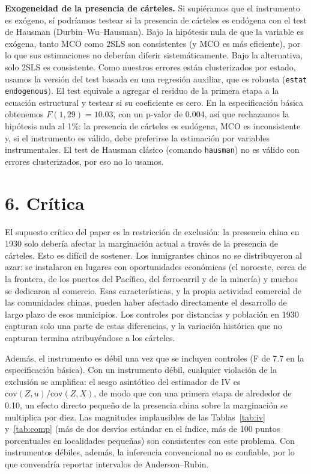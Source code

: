 \documentclass[11pt,a4paper]{article}
\begin{document}
\textbf{Exogeneidad de la presencia de cárteles.} Si supiéramos que el instrumento es exógeno, sí podríamos testear si la presencia de cárteles es endógena con el test de Hausman (Durbin--Wu--Hausman). Bajo la hipótesis nula de que la variable es exógena, tanto MCO como 2SLS son consistentes (y MCO es más eficiente), por lo que sus estimaciones no deberían diferir sistemáticamente. Bajo la alternativa, solo 2SLS es consistente. Como nuestros errores están clusterizados por estado, usamos la versión del test basada en una regresión auxiliar, que es robusta (\texttt{estat endogenous}). El test equivale a agregar el residuo de la primera etapa a la ecuación estructural y testear si su coeficiente es cero. En la especificación básica obtenemos $F(1,29)=10.03$, con un p-valor de 0.004, así que rechazamos la hipótesis nula al 1\%: la presencia de cárteles es endógena, MCO es inconsistente y, si el instrumento es válido, debe preferirse la estimación por variables instrumentales. El test de Hausman clásico (comando \texttt{hausman}) no es válido con errores clusterizados, por eso no lo usamos.

\section*{6. Crítica}

El supuesto crítico del paper es la restricción de exclusión: la presencia china en 1930 solo debería afectar la marginación actual a través de la presencia de cárteles. Esto es difícil de sostener. Los inmigrantes chinos no se distribuyeron al azar: se instalaron en lugares con oportunidades económicas (el noroeste, cerca de la frontera, de los puertos del Pacífico, del ferrocarril y de la minería) y muchos se dedicaron al comercio. Esas características, y la propia actividad comercial de las comunidades chinas, pueden haber afectado directamente el desarrollo de largo plazo de esos municipios. Los controles por distancias y población en 1930 capturan solo una parte de estas diferencias, y la variación histórica que no capturan termina atribuyéndose a los cárteles.

Además, el instrumento es débil una vez que se incluyen controles (F de 7.7 en la especificación básica). Con un instrumento débil, cualquier violación de la exclusión se amplifica: el sesgo asintótico del estimador de IV es $\text{cov}(Z,u)/\text{cov}(Z,X)$, de modo que con una primera etapa de alrededor de 0.10, un efecto directo pequeño de la presencia china sobre la marginación se multiplica por diez. Las magnitudes implausibles de las Tablas~\ref{tab:iv} y~\ref{tab:comp} (más de dos desvíos estándar en el índice, más de 100 puntos porcentuales en localidades pequeñas) son consistentes con este problema. Con instrumentos débiles, además, la inferencia convencional no es confiable, por lo que convendría reportar intervalos de Anderson--Rubin.
\end{document}
